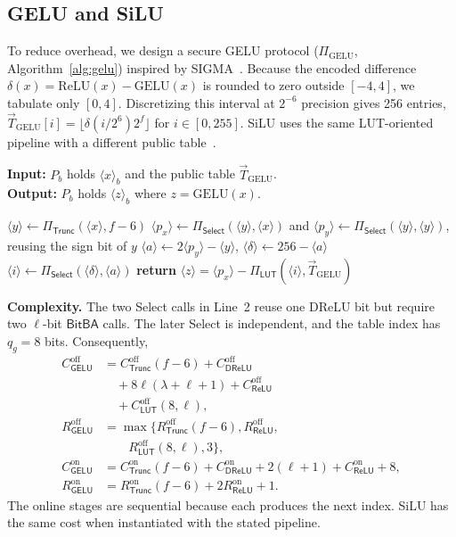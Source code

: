 \documentclass[journal]{IEEEtran}
\theoremstyle{definition}
\theoremstyle{plain}
\newcommand{\ashare}[1]{\langle #1 \rangle}             %
\newcommand{\DReLU}{\mathsf{DReLU}}
\newcommand{\ReLU}{\mathsf{ReLU}}
\newcommand{\BitBA}{\mathsf{BitBA}}
\newcommand{\Trunc}{\Pi_{\mathsf{Trunc}}}
\begin{document}
\subsection{GELU and SiLU}
To reduce overhead, we design a secure GELU protocol ($\Pi_{\text{GELU}}$,
Algorithm~\ref{alg:gelu}) inspired by SIGMA~\cite{sigma}. Because the encoded
difference $\delta(x)=\text{ReLU}(x)-\text{GELU}(x)$ is rounded to zero
outside $[-4,4]$, we tabulate only $[0,4]$. Discretizing this interval at
$2^{-6}$ precision gives 256 entries,
$\vec{T}_{\text{GELU}}[i]=\lfloor\delta(i/2^6)2^f\rfloor$ for
$i\in[0,255]$. SiLU uses the same LUT-oriented pipeline with a different
public table~\cite{sigma}.

\begin{algorithm}[ht]
  \caption{GELU ($\Pi_{\text{GELU}}$)}
  \label{alg:gelu}
  \textbf{Input:} $P_b$ holds $\ashare{x}_b$ and the public table $\vec{T}_{\text{GELU}}$. \\
  \textbf{Output:} $P_b$ holds $\ashare{z}_b$ where $z=\text{GELU}(x)$.
  \begin{algorithmic}[1]
    \State $\ashare y \leftarrow \Trunc(\ashare x,f-6)$
    \State $\ashare{p_x}\leftarrow\Pi_{\mathsf{Select}}(\ashare y,\ashare x)$ and $\ashare{p_y}\leftarrow\Pi_{\mathsf{Select}}(\ashare y,\ashare y)$, reusing the sign bit of $y$
    \State $\ashare a\leftarrow2\ashare{p_y}-\ashare y$, $\ashare\delta\leftarrow256-\ashare a$
    \State $\ashare i\leftarrow\Pi_{\mathsf{Select}}(\ashare\delta,\ashare a)$
    \State \textbf{return} $\ashare z=\ashare{p_x}-\Pi_{\mathsf{LUT}}(\ashare i,\vec{T}_{\text{GELU}})$
  \end{algorithmic}
\end{algorithm}

\textbf{Complexity.} The two Select calls in Line~2 reuse one DReLU bit but
require two $\ell$-bit $\BitBA$ calls. The later Select is independent, and
the table index has $q_g=8$ bits. Consequently,
\begin{equation}
\begin{aligned}
C^{\mathrm{off}}_{\mathsf{GELU}}
 &=C^{\mathrm{off}}_{\mathsf{Trunc}}(f-6)
   +C^{\mathrm{off}}_{\DReLU}\\
 &\quad+8\ell(\lambda+\ell+1)+C^{\mathrm{off}}_{\ReLU}\\
 &\quad+C^{\mathrm{off}}_{\mathsf{LUT}}(8,\ell),\\
R^{\mathrm{off}}_{\mathsf{GELU}}
 &=\max\{R^{\mathrm{off}}_{\mathsf{Trunc}}(f-6),
          R^{\mathrm{off}}_{\ReLU},\\
 &\qquad R^{\mathrm{off}}_{\mathsf{LUT}}(8,\ell),3\},\\
C^{\mathrm{on}}_{\mathsf{GELU}}
 &=C^{\mathrm{on}}_{\mathsf{Trunc}}(f-6)
   +C^{\mathrm{on}}_{\DReLU}+2(\ell+1)
   +C^{\mathrm{on}}_{\ReLU}+8,\\
R^{\mathrm{on}}_{\mathsf{GELU}}
 &=R^{\mathrm{on}}_{\mathsf{Trunc}}(f-6)
   +2R^{\mathrm{on}}_{\ReLU}+1.
\end{aligned}
\label{eq:gelu-cost}
\end{equation}
The online stages are sequential because each produces the next index. SiLU
has the same cost when instantiated with the stated pipeline.
\end{document}
